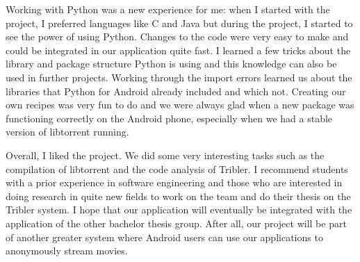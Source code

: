 	  		Working with Python was a new experience for me: when I started with the project, I preferred languages like C and Java but during the project, I started to see the power of using Python. Changes to the code were very easy to make and could be integrated in our application quite fast. I learned a few tricks about the library and package structure Python is using and this knowledge can also be used in further projects. Working through the import errors learned us about the libraries that Python for Android already included and which not. Creating our own recipes was very fun to do and we were always glad when a new package was functioning correctly on the Android phone, especially when we had a stable version of libtorrent running.
	 	
	 		Overall, I liked the project. We did some very interesting tasks such as the compilation of libtorrent and the code analysis of Tribler. I recommend students with a prior experience in software engineering and those who are interested in doing research in quite new fields to work on the team and do their thesis on the Tribler system. I hope that our application will eventually be integrated with the application of the other bachelor thesis group. After all, our project will be part of another greater system where Android users can use our applications to anonymously stream movies.
